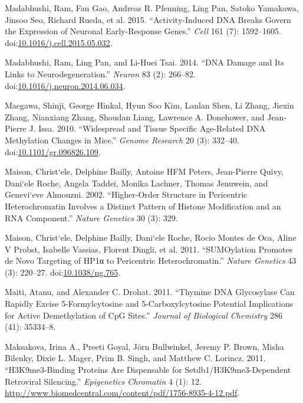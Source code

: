 \documentclass[onehalf,12pt]{beavtex}
\begin{document}
  \hypertarget{ref-MadabhushiActivityInducedDNABreaks2015}{}
  Madabhushi, Ram, Fan Gao, Andreas R. Pfenning, Ling Pan, Satoko
  Yamakawa, Jinsoo Seo, Richard Rueda, et al. 2015. ``Activity-Induced DNA
  Breaks Govern the Expression of Neuronal Early-Response Genes.''
  \emph{Cell} 161 (7): 1592--1605.
  doi:\href{https://doi.org/10.1016/j.cell.2015.05.032}{10.1016/j.cell.2015.05.032}.
  
  \hypertarget{ref-MadabhushiDNADamageIts2014}{}
  Madabhushi, Ram, Ling Pan, and Li-Huei Tsai. 2014. ``DNA Damage and Its
  Links to Neurodegeneration.'' \emph{Neuron} 83 (2): 266--82.
  doi:\href{https://doi.org/10.1016/j.neuron.2014.06.034}{10.1016/j.neuron.2014.06.034}.
  
  \hypertarget{ref-MaegawaWidespreadtissuespecific2010}{}
  Maegawa, Shinji, George Hinkal, Hyun Soo Kim, Lanlan Shen, Li Zhang,
  Jiexin Zhang, Nianxiang Zhang, Shoudan Liang, Lawrence A. Donehower, and
  Jean-Pierre J. Issa. 2010. ``Widespread and Tissue Specific Age-Related
  DNA Methylation Changes in Mice.'' \emph{Genome Research} 20 (3):
  332--40.
  doi:\href{https://doi.org/10.1101/gr.096826.109}{10.1101/gr.096826.109}.
  
  \hypertarget{ref-MaisonHigherorderstructurepericentric2002}{}
  Maison, Christ\a`ele, Delphine Bailly, Antoine HFM Peters, Jean-Pierre
  Quivy, Dani\a`ele Roche, Angela Taddei, Monika Lachner, Thomas Jenuwein,
  and Genevi\a`eve Almouzni. 2002. ``Higher-Order Structure in Pericentric
  Heterochromatin Involves a Distinct Pattern of Histone Modification and
  an RNA Component.'' \emph{Nature Genetics} 30 (3): 329.
  
  \hypertarget{ref-MaisonSUMOylationpromotesnovo2011}{}
  Maison, Christ\a`ele, Delphine Bailly, Dani\a`ele Roche, Rocio Montes de
  Oca, Aline V Probst, Isabelle Vassias, Florent Dingli, et al. 2011.
  ``SUMOylation Promotes de Novo Targeting of HP1α to Pericentric
  Heterochromatin.'' \emph{Nature Genetics} 43 (3): 220--27.
  doi:\href{https://doi.org/10.1038/ng.765}{10.1038/ng.765}.
  
  \hypertarget{ref-MaitiThymineDNAglycosylase2011}{}
  Maiti, Atanu, and Alexander C. Drohat. 2011. ``Thymine DNA Glycosylase
  Can Rapidly Excise 5-Formylcytosine and 5-Carboxylcytosine Potential
  Implications for Active Demethylation of CpG Sites.'' \emph{Journal of
  Biological Chemistry} 286 (41): 35334--8.
  
  \hypertarget{ref-MaksakovaH3K9me3bindingproteinsare2011}{}
  Maksakova, Irina A., Preeti Goyal, Jörn Bullwinkel, Jeremy P. Brown,
  Misha Bilenky, Dixie L. Mager, Prim B. Singh, and Matthew C. Lorincz.
  2011. ``H3K9me3-Binding Proteins Are Dispensable for
  Setdb1/H3K9me3-Dependent Retroviral Silencing.'' \emph{Epigenetics
  Chromatin} 4 (1): 12.
  \url{http://www.biomedcentral.com/content/pdf/1756-8935-4-12.pdf}.
  
\end{document}
